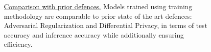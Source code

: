 \begin{figure}[ht!]
\begin{center}
{
}
\caption{\underline{Comparison with prior defences.} Models trained using \method\hspace{0.02in} training methodology are comparable to prior state of the art defences: Adversarial Regularization and Differential Privacy, in terms of test accuracy and inference accuracy while additionally ensuring efficiency.}
\label{fig:compare}
\end{center}
\end{figure}
